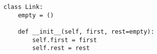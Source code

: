 \begin{lstlisting}
class Link:
    empty = ()

    def __init__(self, first, rest=empty):
        self.first = first
        self.rest = rest
\end{lstlisting}
